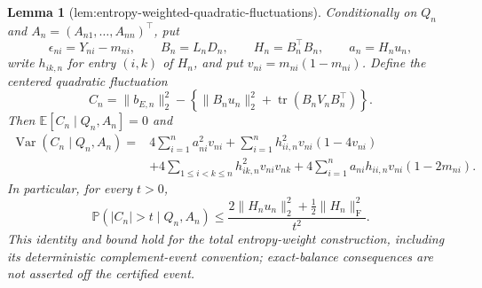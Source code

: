 \documentclass{article}
\newtheorem{lemma}{Lemma}
\begin{document}
\begin{lemma}[lem:entropy-weighted-quadratic-fluctuations]\label{lem:entropy-weighted-quadratic-fluctuations}
Conditionally on \(Q_n\) and \(A_n=(A_{n1},\ldots,A_{nn})^{\top}\), put
\[
 \epsilon_{ni}=Y_{ni}-m_{ni},\qquad
 B_n=L_nD_n,\qquad H_n=B_n^{\top}B_n,\qquad
 a_n=H_nu_n,
\]
write \(h_{ik,n}\) for entry \((i,k)\) of \(H_n\), and put
\(v_{ni}=m_{ni}(1-m_{ni})\).  Define the centered quadratic fluctuation
\[
 C_n=\|b_{E,n}\|_2^2-
 \left\{\|B_nu_n\|_2^2+\operatorname{tr}(B_nV_nB_n^{\top})\right\}.
\]
Then \(\mathbb E[C_n\mid Q_n,A_n]=0\) and
\[
\begin{aligned}
 \operatorname{Var}(C_n\mid Q_n,A_n)
 ={}&4\sum_{i=1}^n a_{ni}^2v_{ni}
 +\sum_{i=1}^n h_{ii,n}^2v_{ni}(1-4v_{ni})\\
 &+4\sum_{1\le i<k\le n}h_{ik,n}^2v_{ni}v_{nk}
 +4\sum_{i=1}^n a_{ni}h_{ii,n}v_{ni}(1-2m_{ni}).
\end{aligned}
\]
In particular, for every \(t>0\),
\[
 \mathbb P\!\left(|C_n|>t\mid Q_n,A_n\right)
 \le
 \frac{2\|H_nu_n\|_2^2+\tfrac12\|H_n\|_{\mathrm F}^2}{t^2}.
\]
This identity and bound hold for the total entropy-weight construction, including its deterministic complement-event convention; exact-balance consequences are not asserted off the certified event.
\end{lemma}
\end{document}
